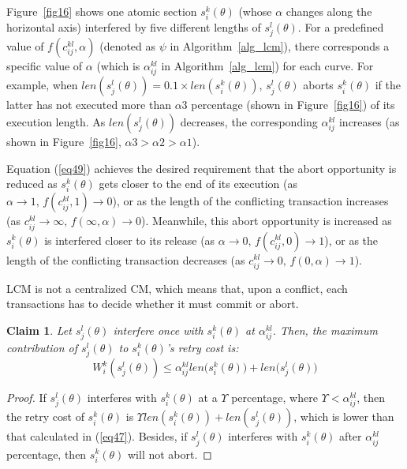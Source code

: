 \documentclass[a4paper,english]{article}
\newtheorem{clm}{Claim}
\newtheorem{proof}{Proof}
\begin{document}
Figure~\ref{fig16} shows one atomic section $s_i^k(\theta)$ (whose $\alpha$ changes along the horizontal axis) interfered by five different lengths of $s_j^l(\theta)$.
For a predefined value of $f(c_{ij}^{kl},\alpha)$ (denoted as $\psi$ in Algorithm~\ref{alg_lcm}), there corresponds a specific value of $\alpha$ (which is $\alpha_{ij}^{kl}$ in Algorithm~\ref{alg_lcm}) for each curve. For example, when $len(s_j^l(\theta))=0.1 \times len(s_i^k(\theta))$, $s_j^l(\theta)$ aborts $s_i^k(\theta)$ if the latter has not executed more than $\alpha3$ percentage (shown in Figure~\ref{fig16}) of its execution length. As $len(s_{j}^{l}(\theta))$ decreases, the corresponding $\alpha_{ij}^{kl}$ increases (as shown in Figure~\ref{fig16}, $\alpha3>\alpha2>\alpha1$).

Equation (\ref{eq49}) achieves the desired requirement that the abort opportunity is reduced as $s_{i}^{k}(\theta)$ gets
closer to the end of its execution (as $\alpha\rightarrow1,\, f(c_{ij}^{kl},1)\rightarrow0$),
or as the length of the conflicting transaction increases (as $c_{ij}^{kl}\rightarrow\infty,\, f(\infty,\alpha)\rightarrow0$).
Meanwhile, this abort opportunity is increased as $s_{i}^{k}(\theta)$
is interfered closer to its release (as $\alpha\rightarrow0,\, f(c_{ij}^{kl},0)\rightarrow1$),
or as the length of the conflicting transaction decreases (as $c_{ij}^{kl}\rightarrow0,\, f(0,\alpha)\rightarrow1$).

LCM is not a centralized CM, which means that, upon a conflict, each transactions has to decide whether it must commit or abort. 

\begin{clm}
\label{LCM_higher_rc}
Let $s_{j}^{l}(\theta)$ interfere once with $s_{i}^{k}(\theta)$ at $\alpha_{ij}^{kl}$. Then, the maximum contribution of $s_{j}^{l}(\theta)$ to 
$s_{i}^{k}(\theta)$'s 
retry cost is:
\begin{equation}
W_i^k(s_j^l(\theta))\le \alpha_{ij}^{kl}len\Big(s_{i}^{k}(\theta)\Big)+len\Big(s_{j}^{l}(\theta)\Big)\label{eq47}\end{equation}
\end{clm}

\begin{proof}\normalfont
If $s_{j}^{l}(\theta)$ interferes with $s_{i}^{k}(\theta)$
at a $\Upsilon$ percentage, where $\Upsilon<\alpha_{ij}^{kl}$,
then the retry cost of $s_{i}^{k}(\theta)$ is $\Upsilon len(s_{i}^{k}(\theta))+len(s_{j}^{l}(\theta))$, which is lower than that calculated in (\ref{eq47}). Besides, 
if $s_{j}^{l}(\theta)$ interferes with $s_{i}^{k}(\theta)$ after
$\alpha_{ij}^{kl}$ percentage, then $s_{i}^{k}(\theta)$ will not
abort.
\end{proof}
\end{document}

